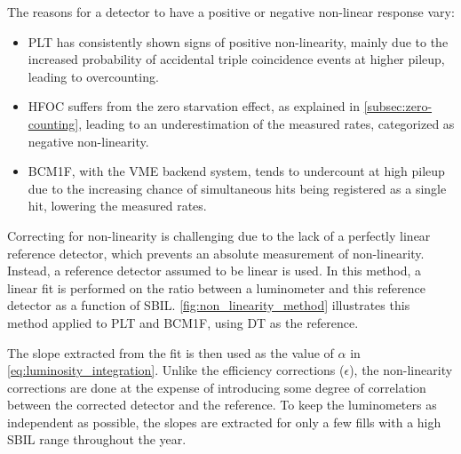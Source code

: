 The reasons for a detector to have a positive or negative non-linear response vary:

\begin{itemize}
    \item PLT has consistently shown signs of positive non-linearity, mainly due to the increased probability of accidental triple coincidence events at higher pileup, leading to overcounting.
    \item HFOC suffers from the zero starvation effect, as explained in \autoref{subsec:zero-counting}, leading to an underestimation of the measured rates, categorized as negative non-linearity.
    \item BCM1F, with the VME backend system, tends to undercount at high pileup due to the increasing chance of simultaneous hits being registered as a single hit, lowering the measured rates.
\end{itemize}

Correcting for non-linearity is challenging due to the lack of a perfectly linear reference detector, which prevents an absolute measurement of non-linearity. Instead, a reference detector assumed to be linear is used. In this method, a linear fit is performed on the ratio between a luminometer and this reference detector as a function of SBIL. \autoref{fig:non_linearity_method} illustrates this method applied to PLT and BCM1F, using DT as the reference.

The slope extracted from the fit is then used as the value of \(\alpha\) in \autoref{eq:luminosity_integration}. Unlike the efficiency corrections (\(\epsilon\)), the non-linearity corrections are done at the expense of introducing some degree of correlation between the corrected detector and the reference. To keep the luminometers as independent as possible, the slopes are extracted for only a few fills with a high SBIL range throughout the year.




